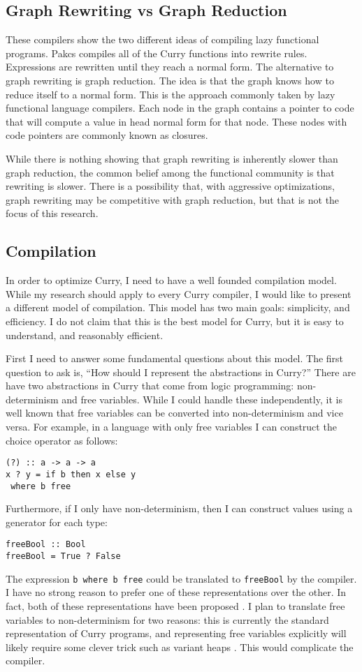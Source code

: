 \subsection{Graph Rewriting vs Graph Reduction}
These compilers show the two different ideas of compiling lazy functional programs.
Pakcs compiles all of the Curry functions into rewrite rules.
Expressions are rewritten until they reach a normal form.
The alternative to graph rewriting is graph reduction.
The idea is that the graph knows how to reduce itself to a normal form.
This is the approach commonly taken by lazy functional language compilers.
Each node in the graph contains a pointer to code that will compute a value in head normal form for that node.
These nodes with code pointers are commonly known as closures.

While there is nothing showing that graph rewriting is inherently slower than graph reduction,
the common belief among the functional community is that rewriting is slower.
There is a possibility that, with aggressive optimizations, graph rewriting may be competitive with graph reduction,
but that is not the focus of this research.

\subsection{Compilation}
In order to optimize Curry, I need to have a well founded compilation model.
While my research should apply to every Curry compiler, I would like to present a different model of compilation.
This model has two main goals: simplicity, and efficiency.
I do not claim that this is the best model for Curry, but it is easy to understand, and reasonably efficient.

First I need to answer some fundamental questions about this model.
The first question to ask is, ``How should I represent the abstractions in Curry?''
There are have two abstractions in Curry that come from logic programming:
non-determinism and free variables.
While I could handle these independently, it is well known that free variables can be converted into
non-determinism and vice versa.
For example, in a language with only free variables I can construct the choice operator as follows:
\begin{verbatim}
(?) :: a -> a -> a
x ? y = if b then x else y
 where b free
\end{verbatim}
Furthermore, if I only have non-determinism, then I can construct values using a generator for each type:
\begin{verbatim}
freeBool :: Bool
freeBool = True ? False
\end{verbatim}
The expression \texttt{b where b free} could be translated to \texttt{freeBool} by the compiler.
I have no strong reason to prefer one of these representations over the other.
In fact, both of these representations have been proposed \cite{curry_vm, Brassel2011PHD}.
I plan to translate free variables to non-determinism for two reasons:
this is currently the standard representation of Curry programs, and representing free variables explicitly
will likely require some clever trick such as variant heaps \cite{curry_vm}.
This would complicate the compiler.

